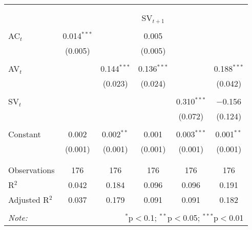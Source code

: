 
\begin{tabular}{@{\extracolsep{5pt}}lccccc} 
\\[-1.8ex]\hline 
\hline \\[-1.8ex] 
\\[-1.8ex] & \multicolumn{5}{c}{SV$_{t+1}$} \\ 
\hline \\[-1.8ex] 
 AC$_{t}$ & 0.014$^{***}$ &  & 0.005 &  &  \\ 
 & (0.005) &  & (0.005) &  &  \\ 
 & & & & & \\ 
 AV$_{t}$ &  & 0.144$^{***}$ & 0.136$^{***}$ &  & 0.188$^{***}$ \\ 
 &  & (0.023) & (0.024) &  & (0.042) \\ 
 & & & & & \\ 
 SV$_{t}$ &  &  &  & 0.310$^{***}$ & $-$0.156 \\ 
 &  &  &  & (0.072) & (0.124) \\ 
 & & & & & \\ 
 Constant & 0.002 & 0.002$^{**}$ & 0.001 & 0.003$^{***}$ & 0.001$^{**}$ \\ 
 & (0.001) & (0.001) & (0.001) & (0.001) & (0.001) \\ 
 & & & & & \\ 
\hline \\[-1.8ex] 
Observations & 176 & 176 & 176 & 176 & 176 \\ 
R$^{2}$ & 0.042 & 0.184 & 0.096 & 0.096 & 0.191 \\ 
Adjusted R$^{2}$ & 0.037 & 0.179 & 0.091 & 0.091 & 0.182 \\ 
\hline 
\hline \\[-1.8ex] 
\textit{Note:}  & \multicolumn{5}{r}{$^{*}$p$<$0.1; $^{**}$p$<$0.05; $^{***}$p$<$0.01} \\ 
\end{tabular} 
